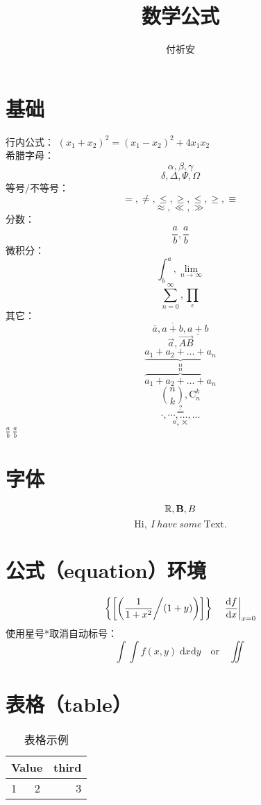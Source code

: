 \documentclass[12pt]{article}
\author{付祈安}
\title{数学公式}
\begin{document}
\maketitle
\tableofcontents
\listoftables

\section{基础}
行内公式：
$ (x_1 + x_2)^2 = (x_1 - x_2)^2 + 4 x_1 x_2 $ \\
希腊字母：
\begin{equation*}
	\alpha, \beta, \gamma
\end{equation*}
\begin{displaymath}
	\delta, \Delta, \Psi, \Omega
\end{displaymath}
等号/不等号：
\[ =, \neq, \leq, \geq, \leqslant, \geqslant, \equiv \]
\[ \approx, \ll, \gg \]
分数：
\[ \frac{a}{b}, \frac ab \]
微积分：
\[ \int^a_b, \lim_{n \rightarrow \infty} \]
\[ \sum_{n=0}^{\infty}, \prod_\epsilon \]
其它：
\[ \bar{a}, \overline{a+b}, \underline{a+b} \]
\[ \vec{a}, \overrightarrow{AB} \]
\[ \underbrace{a_1+a_2+\ldots+a_n}_n \]
\[ \overbrace{a_1+a_2+\ldots+a_n}^n \]
\[ \binom{n}{k}, \mathrm{C}_n^k \]
\[ \stackrel{?}{=} \]
\[ \cdot, \cdots, \dots, \ldots \]
\[ \circ, \times \]
$ \frac ab\ {\displaystyle \frac ab} $
\section{字体}
\[ \mathbb{R}, \mathbf{B}, \boldmath{B} \]
\[ \mathrm{Hi},\ I\ have\ some\ \text{Text}. \]
\section{公式（equation）环境}
\begin{equation}
	\label{eq1}
	\left\{ \left[ \left( \frac{1}{1+x^2} \middle/ (1 + y) \right) \right] \right\}
	\quad \left. \frac{\mathrm{d}f}{\mathrm{d}x} \right|_{x = 0}
\end{equation}
使用星号*取消自动标号：
\begin{equation*}
	\int\!\!\!\int f(x, y) \; \mathrm{d} x \mathrm{d} y
	\quad \text{or} \quad \iint
\end{equation*}
\section{表格（table）}
\begin{table}[htbp]
	\begin{center}
		\begin{tabular}{|l|c|r|}
			\hline
			\multicolumn{2}{|c|}{Value} & third     \\ \hline
			1                           & 2     & 3 \\ \cline{1-1}
		\end{tabular}
		\caption{表格示例}
		\label{tab1}
	\end{center}
\end{table}
\end{document}
